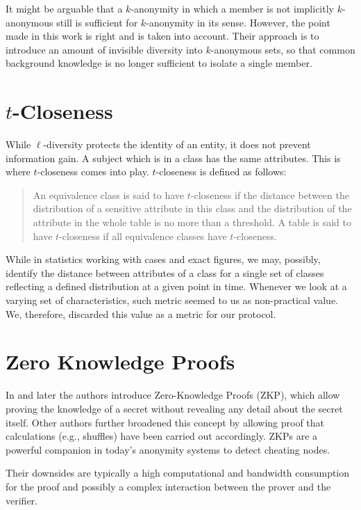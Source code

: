 It might be arguable that a $k$-anonymity in which a member is not implicitly $k$-anonymous still is sufficient for $k$-anonymity in its sense. However, the point made in this work is right and is taken into account. Their approach is to introduce an amount of invisible diversity into $k$-anonymous sets, so that common background knowledge is no longer sufficient to isolate a single member.

\section{\texorpdfstring{$t$}{t}-Closeness}
While $\ell$-diversity protects the identity of an entity, it does not prevent information gain. A subject which is in a class has the same attributes. This is where $t$-closeness\cite{li2007t} comes into play. $t$-closeness is defined as follows:

\begin{quote}
	An equivalence class is said to have $t$-closeness if the distance between the distribution of a sensitive attribute in this class and the distribution of the attribute in the whole table is no more than a threshold. A table is said to have $t$-closeness if all equivalence classes have $t$-closeness.
\end{quote}

While in statistics working with cases and exact figures, we may, possibly, identify the distance between attributes of a class for a single set of classes reflecting a defined distribution at a given point in time. Whenever we look at a varying set of characteristics, such metric seemed to us as non-practical value. We, therefore, discarded this value as a metric for our protocol.

\section{Zero Knowledge Proofs}
In \cite{goldwasser1989knowledge} and later \cite{de1987non} the authors introduce Zero-Knowledge Proofs (ZKP), which allow proving the knowledge of a secret without revealing any detail about the secret itself. Other authors further broadened this concept by allowing proof that calculations (e.g., shuffles) have been carried out accordingly. ZKPs are a powerful companion in today's anonymity systems to detect cheating nodes.

Their downsides are typically a high computational and bandwidth consumption for the proof and possibly a complex interaction between the prover and the verifier.

